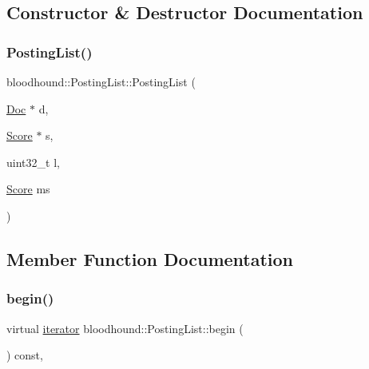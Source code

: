 \subsection{Constructor \& Destructor Documentation}
\mbox{\label{classbloodhound_1_1PostingList_a725f1df76c8278f1d927fff3ed4c496e}} 
\subsubsection{\texorpdfstring{Posting\+List()}{PostingList()}}
{\footnotesize\ttfamily bloodhound\+::\+Posting\+List\+::\+Posting\+List (\begin{DoxyParamCaption}\item[{\hyperlink{structbloodhound_1_1Doc}{Doc} $\ast$}]{d,  }\item[{\hyperlink{structbloodhound_1_1Score}{Score} $\ast$}]{s,  }\item[{uint32\+\_\+t}]{l,  }\item[{\hyperlink{structbloodhound_1_1Score}{Score}}]{ms }\end{DoxyParamCaption})\hspace{0.3cm}{\ttfamily [inline]}}



\subsection{Member Function Documentation}
\mbox{\label{classbloodhound_1_1PostingList_a274f57f133cd6763e0d8cc3e00fa1be3}} 
\subsubsection{\texorpdfstring{begin()}{begin()}}
{\footnotesize\ttfamily virtual \hyperlink{structbloodhound_1_1PostingList_1_1iterator}{iterator} bloodhound\+::\+Posting\+List\+::begin (\begin{DoxyParamCaption}{ }\end{DoxyParamCaption}) const\hspace{0.3cm}{\ttfamily [inline]}, {\ttfamily [virtual]}}

